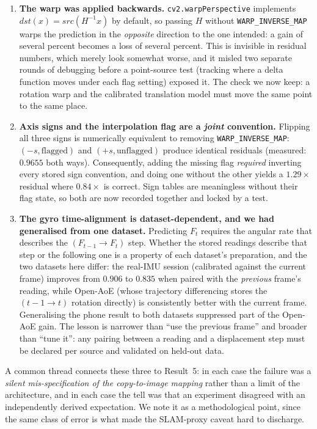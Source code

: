 \documentclass[12pt,a4paper]{article}
\begin{document}
\begin{enumerate}
  \item \textbf{The warp was applied backwards.} \texttt{cv2.warpPerspective} implements $dst(x) = src(H^{-1}x)$ by default, so passing $H$ without \texttt{WARP\_INVERSE\_MAP} warps the prediction in the \emph{opposite} direction to the one intended: a gain of several percent becomes a loss of several percent. This is invisible in residual numbers, which merely look somewhat worse, and it misled two separate rounds of debugging before a point-source test (tracking where a delta function moves under each flag setting) exposed it. The check we now keep: a rotation warp and the calibrated translation model must move the same point to the same place.
  \item \textbf{Axis signs and the interpolation flag are a \emph{joint} convention.} Flipping all three signs is numerically equivalent to removing \texttt{WARP\_INVERSE\_MAP}: $(-s, \text{flagged})$ and $(+s, \text{unflagged})$ produce identical residuals (measured: $0.9655$ both ways). Consequently, adding the missing flag \emph{required} inverting every stored sign convention, and doing one without the other yields a $1.29\times$ residual where $0.84\times$ is correct. Sign tables are meaningless without their flag state, so both are now recorded together and locked by a test.
  \item \textbf{The gyro time-alignment is dataset-dependent, and we had generalised from one dataset.} Predicting $F_t$ requires the angular rate that describes the $(F_{t-1} \to F_t)$ step. Whether the stored readings describe that step or the following one is a property of each dataset's preparation, and the two datasets here differ: the real-IMU session (calibrated against the current frame) improves from $0.906$ to $0.835$ when paired with the \emph{previous} frame's reading, while Open-AoE (whose trajectory differencing stores the $(t{-}1 \to t)$ rotation directly) is consistently better with the current frame. Generalising the phone result to both datasets suppressed part of the Open-AoE gain. The lesson is narrower than ``use the previous frame'' and broader than ``tune it'': any pairing between a reading and a displacement step must be declared per source and validated on held-out data.
\end{enumerate}

A common thread connects these three to Result~5: in each case the failure was a \emph{silent mis-specification of the copy-to-image mapping} rather than a limit of the architecture, and in each case the tell was that an experiment disagreed with an independently derived expectation. We note it as a methodological point, since the same class of error is what made the SLAM-proxy caveat hard to discharge.
\end{document}

